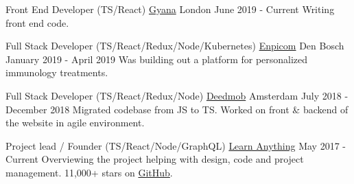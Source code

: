 
\begin{cventries}

  \cventry
    {Front End Developer (TS/React)}
    {\href{https://www.gyana.co.uk}{Gyana}}
    {London}
    {June 2019 - Current}
    {
      {Writing front end code.}
    }

  \cventry
    {Full Stack Developer (TS/React/Redux/Node/Kubernetes)}
    {\href{https://www.enpicom.com}{Enpicom}}
    {Den Bosch}
    {January 2019 - April 2019}
    {
      {Was building out a platform for personalized immunology treatments.}
    }

  \cventry
    {Full Stack Developer (TS/React/Redux/Node)}
    {\href{https://www.deedmob.com}{Deedmob}}
    {Amsterdam}
    {July 2018 - December 2018}
    {
      {Migrated codebase from JS to TS. Worked on front \& backend of the website in agile environment.}
    }

  \cventry
    {Project lead / Founder (TS/React/Node/GraphQL)}
    {\href{https://learn-anything.xyz}{Learn Anything}}
    {}
    {May 2017 - Current}
    {
      {Overviewing the project helping with design, code and project management. 11,000+ stars on \href{https://github.com/learn-anything/learn-anything}{GitHub}.}
    }

\end{cventries}
